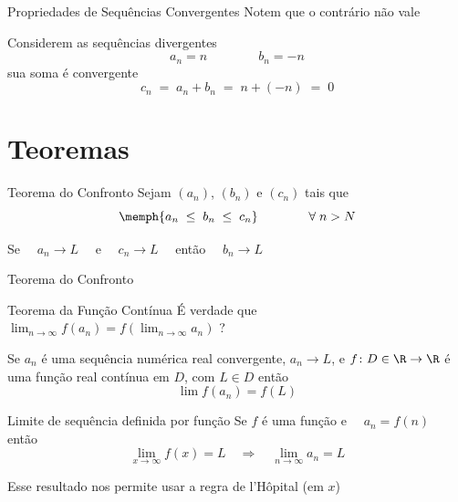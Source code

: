 \begin{frame}{Propriedades de Sequências Convergentes}
	Notem que o contrário não vale

	\pause
	\vspace{\baselineskip}
	Considerem as sequências divergentes
	\[
		a_n = n \qquad\qquad b_n = -n
	\]
	sua soma é convergente
	\[
		c_n \;=\; a_n + b_n \;=\; n + (-n) \;=\; 0
	\]

\end{frame}

\section{Teoremas}

\begin{frame}{Teorema do Confronto}
  Sejam $(a_n)$, $(b_n)$ e $(c_n)$ tais que
  \[
   	\memph{a_n \;\leq\; b_n \;\leq\; c_n} \qquad\qquad \forall\; n > N
 	\]

	\pause
  \vspace{\baselineskip}
  Se $\quad a_n\to L\quad$ e $\quad c_n\to L\quad$ então $\quad b_n\to L$
\end{frame}


\begin{frame}{Teorema do Confronto}
  \centering
  \scalebox{1}{}
\end{frame}

\begin{frame}{Teorema da Função Contínua}
É verdade que \quad
\emph{\(
  \lim_{n\to \infty} f(a_n) = f\!\left(\lim_{n\to \infty} a_n\right)
\)} \quad?

\pause
\vspace{2\baselineskip}
Se $a_n$ é uma sequência numérica real convergente, $a_n\to L$, e
$f\colon D\in\R\to\R$ é uma função real contínua em $D$,
com $L\in D$
então
\[
  \lim f(a_n) = f(L)
\]
\end{frame}

\begin{frame}{Limite de sequência definida por função}
    Se $f$ é uma função e $\quad a_n=f(n)\quad$ então
    \[
    	\lim_{x\to\infty}f(x)=L \quad \Rightarrow \quad \lim_{n\to \infty} a_n=L
    \]

    \pause
    \vspace{\baselineskip}
    Esse resultado nos permite usar a regra de l'Hôpital (em $x$)
\end{frame}

